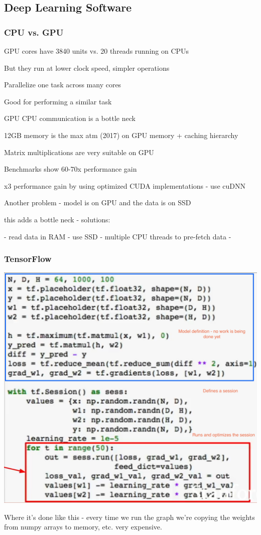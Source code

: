 \subsection{Deep Learning Software}

\subsubsection{CPU vs. GPU}

GPU cores have 3840 units vs. 20 threads running on CPUs 

But they run at lower clock speed, simpler operations

Parallelize one task across many cores

Good for performing a similar task

GPU CPU communication is a bottle neck

12GB memory is the max atm (2017) on GPU memory + caching hierarchy

Matrix multiplications are very suitable on GPU

Benchmarks show 60-70x performance gain

x3 performance gain by using optimized CUDA implementations - use cuDNN

Another problem - model is on GPU and the data is on SSD

this adds a bottle neck - solutions:

	- read data in RAM
	- use SSD
	- multiple CPU threads to pre-fetch data
	- 

\subsubsection{TensorFlow}

\includegraphics[width=0.5\columnwidth]{fei_fei_li/lecture_08/Screenshot 2019-10-21 at 12.32.42.png}

Where it's done like this - every time we run the graph we're copying the weights from numpy arrays to memory, etc. very expensive.


